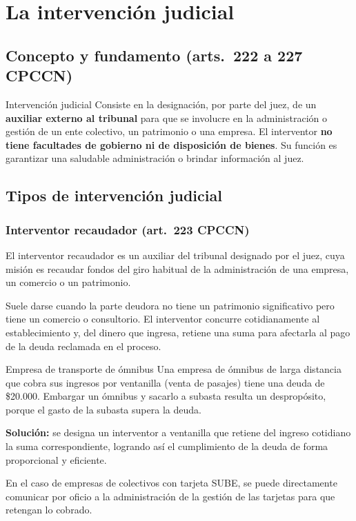 \documentclass[12pt,oneside]{book}
\begin{document}
\section{La intervención judicial}

\subsection{Concepto y fundamento (arts.\ 222 a 227 CPCCN)}

\begin{definition}{Intervención judicial}
Consiste en la designación, por parte del juez, de un \textbf{auxiliar externo al tribunal} para que se involucre en la administración o gestión de un ente colectivo, un patrimonio o una empresa. El interventor \textbf{no tiene facultades de gobierno ni de disposición de bienes}. Su función es garantizar una saludable administración o brindar información al juez.
\end{definition}

\subsection{Tipos de intervención judicial}

\subsubsection{Interventor recaudador (art.\ 223 CPCCN)}

El interventor recaudador es un auxiliar del tribunal designado por el juez, cuya misión es recaudar fondos del giro habitual de la administración de una empresa, un comercio o un patrimonio.

Suele darse cuando la parte deudora no tiene un patrimonio significativo pero tiene un comercio o consultorio. El interventor concurre cotidianamente al establecimiento y, del dinero que ingresa, retiene una suma para afectarla al pago de la deuda reclamada en el proceso.

\begin{example}{Empresa de transporte de ómnibus}
Una empresa de ómnibus de larga distancia que cobra sus ingresos por ventanilla (venta de pasajes) tiene una deuda de \$20.000. Embargar un ómnibus y sacarlo a subasta resulta un despropósito, porque el gasto de la subasta supera la deuda.

\textbf{Solución:} se designa un interventor a ventanilla que retiene del ingreso cotidiano la suma correspondiente, logrando así el cumplimiento de la deuda de forma proporcional y eficiente.

En el caso de empresas de colectivos con tarjeta SUBE, se puede directamente comunicar por oficio a la administración de la gestión de las tarjetas para que retengan lo cobrado.
\end{example}
\end{document}
